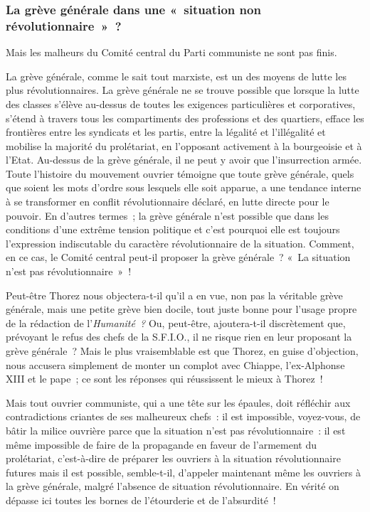 \documentclass[french,twoside]{book} %
\begin{document}
\subsubsection[{La grève générale dans une « situation non révolutionnaire » ?}]{La grève générale dans une « situation non révolutionnaire » ?}
\noindent Mais les malheurs du Comité central du Parti communiste ne sont pas finis.\par
La grève générale, comme le sait tout marxiste, est un des moyens de lutte les plus révolutionnaires. La grève générale ne se trouve possible que lorsque la lutte des classes s’élève au-dessus de toutes les exigences particulières et corporatives, s’étend à travers tous les compartiments des professions et des quartiers, efface les frontières entre les syndicats et les partis, entre la légalité et l’illégalité et mobilise la majorité du prolétariat, en l’opposant activement à la bourgeoisie et à l’Etat. Au-dessus de la grève générale, il ne peut y avoir que l’insurrection armée. Toute l’histoire du mouvement ouvrier témoigne que toute grève générale, quels que soient les mots d’ordre sous lesquels elle soit apparue, a une tendance interne à se transformer en conflit révolutionnaire déclaré, en lutte directe pour le pouvoir. En d’autres termes ; la grève générale n’est possible que dans les conditions d’une extrême tension politique et c’est pourquoi elle est toujours l’expression indiscutable du caractère révolutionnaire de la situation. Comment, en ce cas, le Comité central peut-il proposer la grève générale ? « La situation n’est pas révolutionnaire » !\par
Peut-être Thorez nous objectera-t-il qu’il a en vue, non pas la véritable grève générale, mais une petite grève bien docile, tout juste bonne pour l’usage propre de la rédaction  de l’\emph{Humanité ?} Ou, peut-être, ajoutera-t-il discrètement que, prévoyant le refus des chefs de la S.F.I.O., il ne risque rien en leur proposant la grève générale ? Mais le plus vraisemblable est que Thorez, en guise d’objection, nous accusera simplement de monter un complot avec Chiappe, l’ex-Alphonse XIII et le pape ; ce sont les réponses qui réussissent le mieux à Thorez !\par
Mais tout ouvrier communiste, qui a une tête sur les épaules, doit réfléchir aux contradictions criantes de ses malheureux chefs : il est impossible, voyez-vous, de bâtir la milice ouvrière parce que la situation n’est pas révolutionnaire : il est même impossible de faire de la propagande en faveur de l’armement du prolétariat, c’est-à-dire de préparer les ouvriers à la situation révolutionnaire futures mais il est possible, semble-t-il, d’appeler maintenant même les ouvriers à la grève générale, malgré l’absence de situation révolutionnaire. En vérité on dépasse ici toutes les bornes de l’étourderie et de l’absurdité !
\end{document}
